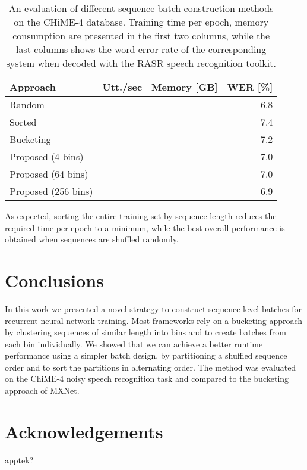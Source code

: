 \documentclass{article}
\begin{document}
	\begin{table}[tbp]
		\centering
		\caption{An evaluation of different sequence batch construction methods on the CHiME-4 database. Training time per epoch, memory consumption are presented in the first two columns, while the last columns shows the word error rate of the corresponding system
		when decoded with the RASR speech recognition toolkit.}
		\label{tab:chime:batch}
		\begin{tabular}{lrrr}
			\hline
			Approach                & Utt./sec & Memory [GB] & WER [\%]          \\
			\hline
			Random 					&	       & 			 & 6.8		 \\
			Sorted					& 		   &			 & 7.4		 \\
			\hline
			Bucketing				&		   &			 & 7.2		 \\
			Proposed (4 bins)	&		   &			 & 7.0		 \\
			Proposed (64 bins)	&		   &			 & 7.0		 \\
			Proposed (256 bins)	&		   &			 & 6.9		 \\
			\hline
		\end{tabular}
	\end{table}

  As expected, sorting the entire training set by sequence length reduces the required time 
  per epoch to a minimum, while the best overall performance is obtained when sequences are shuffled randomly.
  
      
  \section{Conclusions}
    In this work we presented a novel strategy to construct sequence-level batches for recurrent 
    neural network training. Most frameworks rely on a bucketing approach by clustering sequences of similar length into bins and to create batches from each bin individually. We showed that we can achieve a better runtime performance using a simpler batch design, by partitioning a shuffled sequence order and to sort the partitions in alternating order. The method was evaluated on the ChiME-4 noisy speech recognition task and 
    compared to the bucketing approach of MXNet.

   \section{Acknowledgements}
 
   apptek?
   
   \ninept
   
   
\end{document}
